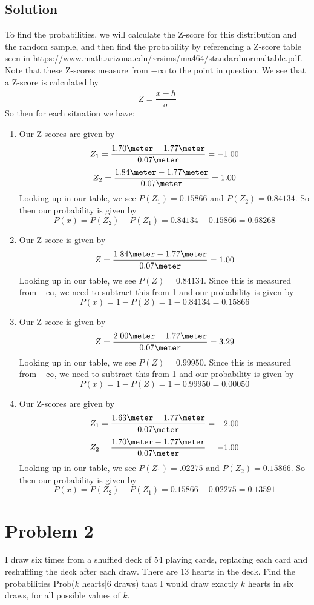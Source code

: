 \documentclass[]{article}
\newcommand{\bd}{\textbf}
\begin{document}
		\subsection*{Solution}
			To find the probabilities, we will calculate the Z-score for this distribution and the random sample, and then find the probability by referencing a Z-score table seen in \url{https://www.math.arizona.edu/~rsims/ma464/standardnormaltable.pdf}. Note that these Z-scores measure from $-\infty$ to the point in question. We see that a Z-score is calculated by
			\[
				Z = \frac{x - \bar h}{\sigma}
			\]
			So then for each situation we have:
			\begin{enumerate}[label = \bd{(\alph*)}]
				\item Our Z-scores are given by
				\[
					Z_1 = \frac{1.70\meter - 1.77\meter}{0.07 \meter} = -1.00
				\]
				\[
					Z_2 = \frac{1.84\meter - 1.77\meter}{0.07 \meter} = 1.00
				\]
				Looking up in our table, we see $P(Z_1) = 0.15866 $ and $P(Z_2) = 0.84134$. So then our probability is given by
				\[
					P(x) =P(Z_2) - P(Z_1) =  0.84134 - 0.15866  = \boxed{0.68268}
				\]
				\item Our Z-score is given by
				\[
				 Z = \frac{1.84\meter - 1.77\meter}{0.07 \meter} = 1.00
				\]
				Looking up in our table, we see $P(Z) = 0.84134$. Since this is measured from $-\infty$, we need to subtract this from 1 and our probability is given by
				\[
					P(x) = 1- P(Z) = 1- 0.84134 = \boxed{0.15866}
				\]
				\item 
				Our Z-score is given by
				\[
					Z = \frac{2.00\meter - 1.77\meter}{0.07 \meter} = 3.29
				\]
				Looking up in our table, we see $P(Z) = 0.99950$. Since this is measured from $-\infty$, we need to subtract this from 1 and our probability is given by
				\[
				P(x) = 1- P(Z) = 1- 0.99950 = \boxed{0.00050}
				\]
				\item Our Z-scores are given by
				\[
				Z_1 = \frac{1.63\meter - 1.77\meter}{0.07 \meter} = -2.00
				\]
				\[
				Z_2 = \frac{1.70\meter - 1.77\meter}{0.07 \meter} = -1.00
				\]
				Looking up in our table, we see $P(Z_1) = .02275$ and $P(Z_2) = 0.15866$. So then our probability is given by
				\[
				 P(x) =P(Z_2) - P(Z_1) = 0.15866 - 0.02275  = \boxed{0.13591}
				\] 
			\end{enumerate}
	\section*{Problem 2} %
		I draw six times from a shuffled deck of 54 playing cards, replacing each card and
		reshuffling the deck after each draw. There are 13 hearts in the deck. Find the probabilities Prob($k$ hearts|6 draws) that I would draw exactly $k$ hearts in six draws, for all possible values of $k$. 
\end{document}
